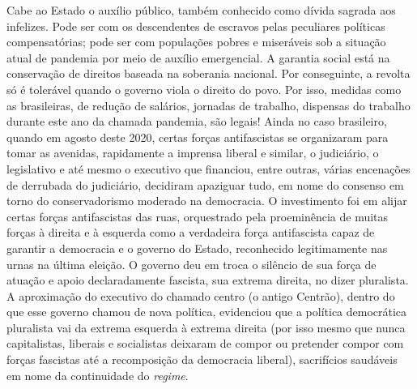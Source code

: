 Cabe ao Estado o auxílio público, também conhecido como dívida sagrada
aos infelizes. Pode ser com os descendentes de escravos pelas peculiares
políticas compensatórias; pode ser com populações pobres e miseráveis
sob a situação atual de pandemia por meio de auxílio emergencial. A
garantia social está na conservação de direitos baseada na soberania
nacional. Por conseguinte, a revolta só é tolerável quando o governo
viola o direito do povo. Por isso, medidas como as brasileiras, de
redução de salários, jornadas de trabalho, dispensas do trabalho durante
este ano da chamada pandemia, são legais! Ainda no caso brasileiro,
quando em agosto deste 2020, certas forças antifascistas se organizaram
para tomar as avenidas, rapidamente a imprensa liberal e similar, o
judiciário, o legislativo e até mesmo o executivo que financiou, entre
outras, várias encenações de derrubada do judiciário, decidiram
apaziguar tudo, em nome do consenso em torno do conservadorismo moderado
na democracia. O investimento foi em alijar certas forças antifascistas
das ruas, orquestrado pela proeminência de muitas forças à direita e à
esquerda como a verdadeira força antifascista capaz de garantir a
democracia e o governo do Estado, reconhecido legitimamente nas urnas na
última eleição. O governo deu em troca o silêncio de sua força de
atuação e apoio declaradamente fascista, sua extrema direita, no dizer
pluralista. A aproximação do executivo do chamado centro (o antigo
Centrão), dentro do que esse governo chamou de nova política, evidenciou
que a política democrática pluralista vai da extrema esquerda à extrema
direita (por isso mesmo que nunca capitalistas, liberais e socialistas
deixaram de compor ou pretender compor com forças fascistas até a
recomposição da democracia liberal), sacrifícios saudáveis em nome da
continuidade do \emph{regime}.

